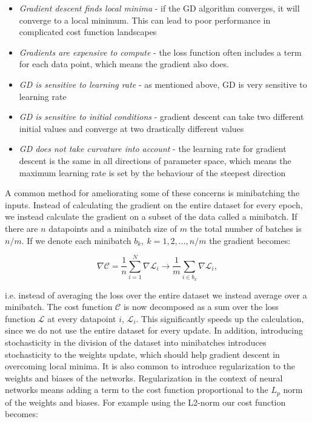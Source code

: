 \begin{itemize}
    \item \textit{Gradient descent finds local minima} - 
        if the GD algorithm converges, it will converge to
        a local minimum. This can lead to poor performance
        in complicated cost function landscapes
    \item \textit{Gradients are expensive to compute} - 
        the loss function often includes a term for each
        data point, which means the gradient also does.
    \item \textit{GD is sensitive to learning rate} - 
        as mentioned above, GD is very sensitive to
        learning rate
    \item \textit{GD is sensitive to initial conditions} - 
        gradient descent can take two different initial values
        and converge at two drastically different values
    \item \textit{GD does not take curvature into account} - 
        the learning rate for gradient descent is the same
        in all directions of parameter space, which means
        the maximum learning rate is set by the behaviour of the
        steepest direction
\end{itemize}

A common method for ameliorating some of these concerns
is minibatching the inputs. Instead of calculating
the gradient on the entire dataset for every epoch,
we instead calculate the gradient on a subset
of the data called a minibatch.
If there are $n$ datapoints and a minibatch size
of $m$ the total number of batches is $n/m$.
If we denote each minibatch $b_k, \ k=1,2,\dots,n/m$
the gradient becomes:

\begin{equation}
 \nabla \mathcal{C} = \frac{1}{n} \sum_{i=1}^N
    \nabla \mathcal{L}_i \rightarrow
    \frac{1}{m} \sum_{i \in b_k} \nabla \mathcal{L}_i , 
\end{equation}

i.e. instead of averaging the loss over the entire dataset
we instead average over a minibatch. The cost function $\mathcal{C}$
is now decomposed as a sum over the loss function $\mathcal{L}$
at every datapoint $i$, $\mathcal{L}_i$.
This significantly speeds up the calculation, since
we do not use the entire dataset for every update.
In addition, introducing stochasticity in the
division of the dataset into minibatches introduces stochasticity
to the weights update, which should help gradient descent
in overcoming local minima.
It is also common to introduce regularization to the weights
and biases of the networks. Regularization in the context
of neural networks means adding a term to the cost function proportional
to the $L_p$ norm of the weights and biases.
For example using the L2-norm our cost function becomes:


